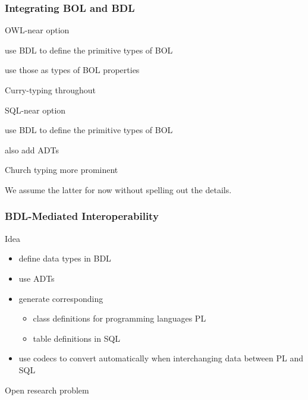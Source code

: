 \documentclass{beamer}
\begin{document}
\begin{frame}\frametitle{Integrating BOL and BDL}
\begin{blockitems}{OWL-near option}
\item use BDL to define the primitive types of BOL
\item use those as types of BOL properties
\item Curry-typing throughout
\end{blockitems}

\begin{blockitems}{SQL-near option}
\item use BDL to define the primitive types of BOL
\item also add ADTs
\item Church typing more prominent
\end{blockitems}

We assume the latter for now without spelling out the details.
\end{frame}

\begin{frame}\frametitle{BDL-Mediated Interoperability}
Idea
 \begin{itemize}
 \item define data types in BDL 
 \item use ADTs
 \item generate corresponding
  \begin{itemize}
  \item class definitions for programming languages PL
  \item table definitions in SQL
  \end{itemize}
 \item use codecs to convert automatically when interchanging data between PL and SQL
 \end{itemize}

Open research problem
\end{frame}
\end{document}
